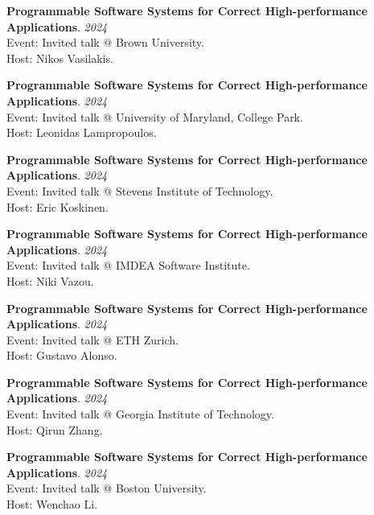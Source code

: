\begin{minipage}{\textwidth}
\textbf{Programmable Software Systems for Correct High-performance Applications}. \hfill {\em 2024}\\
Event: Invited talk @ Brown University.\\
 Host: Nikos Vasilakis.
\end{minipage}

\begin{minipage}{\textwidth}
\textbf{Programmable Software Systems for Correct High-performance Applications}. \hfill {\em 2024}\\
Event: Invited talk @ University of Maryland, College Park.\\
 Host: Leonidas Lampropoulos.
\end{minipage}

\begin{minipage}{\textwidth}
\textbf{Programmable Software Systems for Correct High-performance Applications}. \hfill {\em 2024}\\
Event: Invited talk @ Stevens Institute of Technology.\\
 Host: Eric Koskinen.
\end{minipage}

\begin{minipage}{\textwidth}
\textbf{Programmable Software Systems for Correct High-performance Applications}. \hfill {\em 2024}\\
Event: Invited talk @ IMDEA Software Institute.\\
 Host: Niki Vazou.
\end{minipage}

\begin{minipage}{\textwidth}
\textbf{Programmable Software Systems for Correct High-performance Applications}. \hfill {\em 2024}\\
Event: Invited talk @ ETH Zurich.\\
 Host: Gustavo Alonso.
\end{minipage}

\begin{minipage}{\textwidth}
\textbf{Programmable Software Systems for Correct High-performance Applications}. \hfill {\em 2024}\\
Event: Invited talk @ Georgia Institute of Technology.\\
 Host: Qirun Zhang.
\end{minipage}

\begin{minipage}{\textwidth}
\textbf{Programmable Software Systems for Correct High-performance Applications}. \hfill {\em 2024}\\
Event: Invited talk @ Boston University.\\
 Host: Wenchao Li.
\end{minipage}

